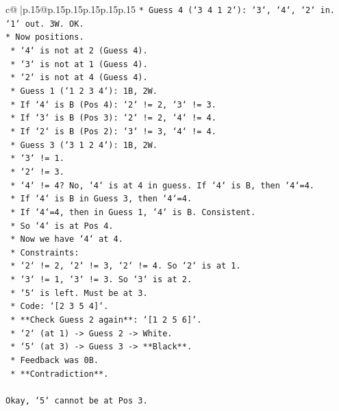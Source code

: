 \documentclass{article}
\begin{document}
{\begin{supertabular}{c@{$\;$}|p{.15\linewidth}@{}p{.15\linewidth}p{.15\linewidth}p{.15\linewidth}p{.15\linewidth}p{.15\linewidth}}
{{{\texttt{*   Guess 4 (`3 4 1 2`): `3`, `4`, `2` in. `1` out. 3W. OK.} \\
\texttt{*   Now positions.} \\
\texttt{    *   `4` is not at 2 (Guess 4).} \\
\texttt{    *   `3` is not at 1 (Guess 4).} \\
\texttt{    *   `2` is not at 4 (Guess 4).} \\
\texttt{    *   Guess 1 (`1 2 3 4`): 1B, 2W.} \\
\texttt{        *   If `4` is B (Pos 4): `2` != 2, `3` != 3.} \\
\texttt{        *   If `3` is B (Pos 3): `2` != 2, `4` != 4.} \\
\texttt{        *   If `2` is B (Pos 2): `3` != 3, `4` != 4.} \\
\texttt{    *   Guess 3 (`3 1 2 4`): 1B, 2W.} \\
\texttt{        *   `3` != 1.} \\
\texttt{        *   `2` != 3.} \\
\texttt{        *   `4` != 4? No, `4` is at 4 in guess. If `4` is B, then `4`=4.} \\
\texttt{        *   If `4` is B in Guess 3, then `4`=4.} \\
\texttt{        *   If `4`=4, then in Guess 1, `4` is B. Consistent.} \\
\texttt{        *   So `4` is at Pos 4.} \\
\texttt{    *   Now we have `4` at 4.} \\
\texttt{    *   Constraints:} \\
\texttt{        *   `2` != 2, `2` != 3, `2` != 4. So `2` is at 1.} \\
\texttt{        *   `3` != 1, `3` != 3. So `3` is at 2.} \\
\texttt{        *   `5` is left. Must be at 3.} \\
\texttt{    *   Code: `{[}2 3 5 4{]}`.} \\
\texttt{    *   **Check Guess 2 again**: `{[}1 2 5 6{]}`.} \\
\texttt{        *   `2` (at 1) {-}> Guess 2 {-}> White.} \\
\texttt{        *   `5` (at 3) {-}> Guess 3 {-}> **Black**.} \\
\texttt{        *   Feedback was 0B.} \\
\texttt{        *   **Contradiction**.} \\
\\ 
\texttt{Okay, `5` cannot be at Pos 3.} \\
}}}
\end{supertabular}}
\end{document}
